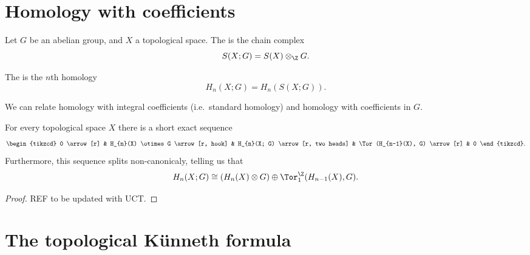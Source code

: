 \documentclass[main.tex]{subfiles}
\begin{document}
\section{Homology with coefficients}
\label{sec:homology_with_coefficients}

\begin{definition}
  \label{def:homology_with_coefficients}
  Let $G$ be an abelian group, and $X$ a topological space. The  is the chain complex
  \begin{equation*}
    S(X; G) = S(X) \otimes_{\Z} G.
  \end{equation*}

  The  is the $n$th homology
  \begin{equation*}
    H_{n}(X; G) = H_{n}(S(X; G)).
  \end{equation*}
\end{definition}

We can relate homology with integral coefficients (i.e.\ standard homology) and homology with coefficients in $G$.

\begin{theorem}
  \label{thm:topological_universal_coefficient_theorem}
  For every topological space $X$ there is a short exact sequence
  \begin{equation*}
    \begin{tikzcd}
      0
      \arrow[r]
      & H_{n}(X) \otimes G
      \arrow[r, hook]
      & H_{n}(X; G)
      \arrow[r, two heads]
      & \Tor(H_{n-1}(X), G)
      \arrow[r]
      & 0
    \end{tikzcd}.
  \end{equation*}
  Furthermore, this sequence splits non-canonicaly, telling us that
  \begin{equation*}
    H_{n}(X; G) \cong (H_{n}(X) \otimes G) \oplus \Tor^{\Z}_{1}(H_{n-1}(X), G).
  \end{equation*}
\end{theorem}
\begin{proof}
  REF to be updated with UCT.
\end{proof}

\section{The topological Künneth formula}
\label{sec:the_topological_kunneth_formula}
\end{document}
